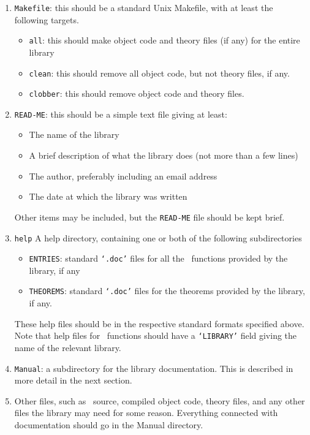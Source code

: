 \begin{enumerate}

\item{\tt Makefile}: this should be a standard Unix Makefile, with at least the
following targets.

\begin{itemize}

\item{\tt all}: this should make object code and theory files (if any) for the
entire library

\item{\tt clean}: this should remove all object code, but not theory files, if
any.

\item{\tt clobber}: this should remove object code and theory files.

\end{itemize}

\item{\tt READ-ME}: this should be a simple text file giving at least:

\begin{itemize}
\item The name of the library
\item A brief description of what the library does (not more than a few lines)
\item The author, preferably including an email address
\item The date at which the library was written
\end{itemize}

Other items may be included, but the {\tt READ-ME} file should be kept brief.

\item{\tt help} A help directory, containing one or both of the following
subdirectories
\begin{itemize}
\item{\tt ENTRIES}: standard {\tt `.doc'} files for all the \ML\ functions
provided by the library, if any
\item{\tt THEOREMS}: standard {\tt `.doc'} files for the theorems provided by
the library, if any.
\end{itemize}

These help files should be in the respective standard formats specified above.
Note that help files for \ML\ functions should have a {\tt `LIBRARY'} field
giving the name of the relevant library.

\item{\tt Manual}: a subdirectory for the library documentation. This is
described in more detail in the next section.

\item Other files, such as \ML\ source, compiled object code, theory files, and
any other files the library may need for some reason. Everything connected with
documentation should go in the Manual directory.

\end{enumerate}

